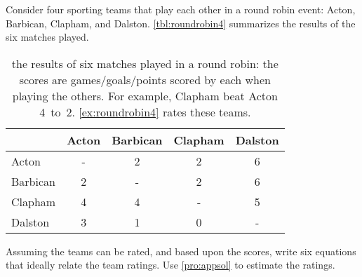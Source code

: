 \begin{exercise} \label{ex:roundrobin4} 
Consider four sporting teams that play each other in a round robin  event: Acton, Barbican, Clapham, and Dalston.
\autoref{tbl:roundrobin4} summarizes the results of the six matches played.
\begin{table}
\caption{the results of six matches played in a round robin: the scores are games\slash goals\slash points scored by each when playing the others.  For example, Clapham beat Acton 4~to~2. \autoref{ex:roundrobin4} rates these teams.}
\label{tbl:roundrobin4}
\begin{center}
\begin{tabular}{l|cccc} \hline
&Acton& Barbican& Clapham& Dalston\\ \hline
Acton & - & 2 & 2 & 6 \\
Barbican & 2 & - & 2 & 6 \\
Clapham & 4 & 4 & - & 5 \\
Dalston & 3 & 1 & 0 & - \\ \hline
\end{tabular}
\end{center}
\end{table}%
Assuming the teams can be rated, and  based upon the scores, write six equations that ideally relate the team ratings.  
Use \autoref{pro:appsol} to estimate the ratings.
\end{exercise}



